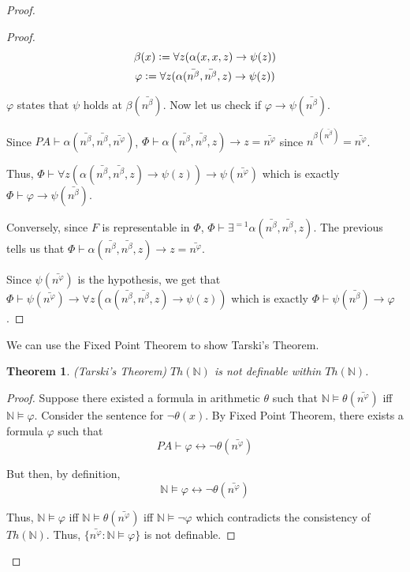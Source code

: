 \documentclass[a4paper,10pt]{article}
\newtheorem{theorem}{Theorem}[section]
\let\phi\varphi
\newcommand*\NN{\mathbb{N}}
\newcommand*\map{\rightarrow}
\newcommand*\n{\newline\par}
\newcommand*\defeq{\vcentcolon=}
\newcommand*\betabar{\bar{n^{\beta}}}
\newcommand*\phibar{\bar{n^{\phi}}}
\newcommand*\prf{\vdash}
\newcommand*\mo{\vDash}
\newcommand*\biject{\leftrightarrow}
\begin{document}
\begin{proof}
\begin{proof}
 \begin{gather*}
  \beta(x) \defeq \forall z(\alpha(x,x,z) \map \psi(z)) \\
  \phi \defeq \forall z(\alpha(\bar{n^{\beta}},\bar{n^{\beta}},z) \map \psi(z))  
 \end{gather*}

 $\phi$ states that $\psi$ holds at $\beta(\bar{n^{\beta}})$. Now let us check if $\phi \map \psi(\bar{n^{\beta}})$. \n
 Since $PA \vdash \alpha(\bar{n^{\beta}},\bar{n^{\beta}},\bar{n^{\phi}})$, $\Phi \vdash \alpha(\bar{n^{\beta}},\bar{n^{\beta}},z) \map z = \bar{n^{\phi}}$ since $n^{\beta(\bar{n^{\beta}})} = \bar{n^{\phi}}$.\n 
 Thus, $\Phi \vdash  \forall z (\alpha(\bar{n^{\beta}},\bar{n^{\beta}},z) \map \psi(z)) \map \psi(\bar{n^{\phi}})$ which is exactly $\Phi \vdash \phi \map \psi(\bar{n^{\beta}})$. \n
  Conversely, since $F$ is representable in $\Phi$, $\Phi \vdash \exists^{=1}\alpha(\betabar,\betabar,z)$. The previous tells us that $\Phi \vdash \alpha(\bar{n^{\beta}},\bar{n^{\beta}},z) \map z = \bar{n^{\phi}}$. \n 
  Since  $\psi(\bar{n^{\phi}})$ is the hypothesis, we get that
  $\Phi \vdash \psi(\bar{n^{\phi}}) \map \forall z(\alpha(\bar{n^{\beta}},\bar{n^{\beta}},z) \map \psi(z))$ which is exactly $\Phi \vdash \psi(\bar{n^{\beta}}) \map \phi$.
\end{proof}

  We can use the Fixed Point Theorem to show Tarski's Theorem.
  
  \begin{theorem}
   (Tarski's Theorem) $Th(\NN)$ is not definable within $Th(\NN)$.
  \end{theorem}
  
  \begin{proof}
   Suppose there existed a formula in arithmetic $\theta$ such that $\NN \mo \theta(\phibar)$ iff $\NN \mo \phi$. Consider the sentence for $\neg\theta(x)$. By Fixed Point Theorem, there exists a formula $\phi$ such that
   \begin{equation*}
    PA \prf \phi \biject \neg\theta(\phibar) 
   \end{equation*}

   But then, by definition,
   \begin{equation*}
    \NN \mo \phi \biject \neg\theta(\phibar) 
   \end{equation*}
    
   Thus, $\NN \mo \phi$ iff $\NN \mo \theta(\phibar)$ iff $\NN \mo \neg\phi$ which contradicts the consistency of $Th(\NN)$. Thus, $\{\phibar : \NN \mo \phi\}$ is not definable.
  \end{proof}


\end{proof}
\end{document}
